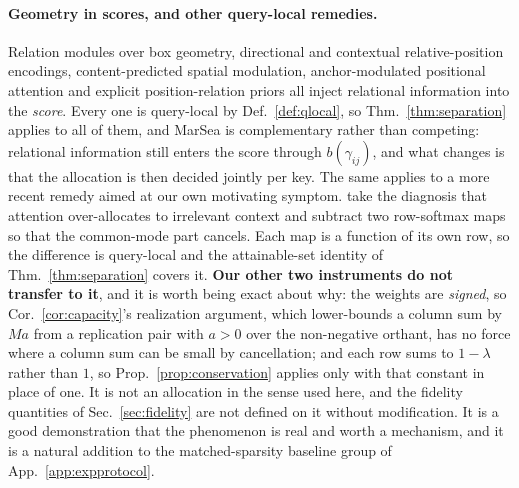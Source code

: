\documentclass{article}
\begin{document}
\paragraph{Geometry in scores, and other query-local remedies.} Relation modules over box
geometry, directional and contextual relative-position encodings, content-predicted spatial
modulation, anchor-modulated positional attention and explicit position-relation priors
\citep{hu2018relation,wu2021rethinking,gao2021fast,liu2022dab,hou2024relation} all inject
relational information into the \emph{score}. Every one is query-local by Def.~\ref{def:qlocal},
so Thm.~\ref{thm:separation} applies to all of them, and MarSea is complementary rather than
competing: relational information still enters the score through $b(\gamma_{ij})$, and what
changes is that the allocation is then decided jointly per key. The same applies to a more recent
remedy aimed at our own motivating symptom. \citet{ye2024differential} take the diagnosis that
attention over-allocates to irrelevant context and subtract two row-softmax maps so that the
common-mode part cancels. Each map is a function of its own row, so the difference is query-local and the attainable-set
identity of Thm.~\ref{thm:separation} covers it. \textbf{Our other two instruments do not
transfer to it}, and it is worth being exact about why: the weights are \emph{signed}, so
Cor.~\ref{cor:capacity}'s realization argument, which lower-bounds a column sum by $Ma$ from a
replication pair with $a>0$ over the non-negative orthant, has no force where a column sum can be
small by cancellation; and each row sums to $1-\lambda$ rather than $1$, so
Prop.~\ref{prop:conservation} applies only with that constant in place of one. It is not an
allocation in the sense used here, and the fidelity quantities of Sec.~\ref{sec:fidelity} are
not defined on it without modification. It is a good demonstration that the phenomenon is real and
worth a mechanism, and it is a natural addition to the matched-sparsity baseline group of
App.~\ref{app:expprotocol}.
\end{document}

